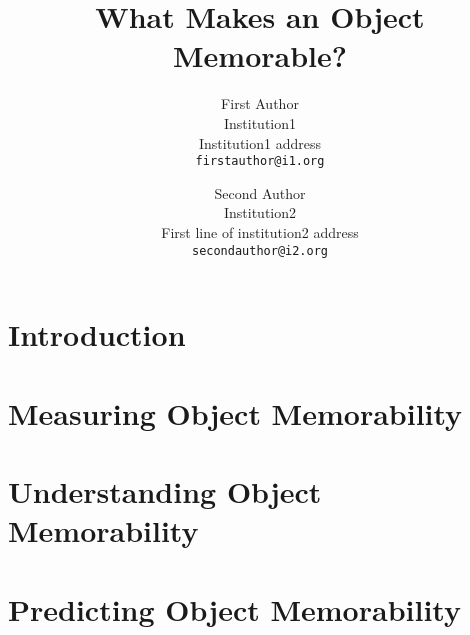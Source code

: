 \documentclass[10pt,twocolumn,letterpaper]{article}
\begin{document}
\title{What Makes an Object Memorable?}

\author{First Author\\
Institution1\\
Institution1 address\\
{\tt\small firstauthor@i1.org}
\and
Second Author\\
Institution2\\
First line of institution2 address\\
{\tt\small secondauthor@i2.org}
}

\maketitle


\begin{abstract}
 
\end{abstract}

\section{Introduction}
\label{sec:introduction}


\section{Measuring Object Memorability}
\label{sec:measuring}



\section{Understanding Object Memorability}
\label{sec:understanding}


\section{Predicting Object Memorability}
\label{sec:predicting}



\clearpage
{\small


}
\end{document}
